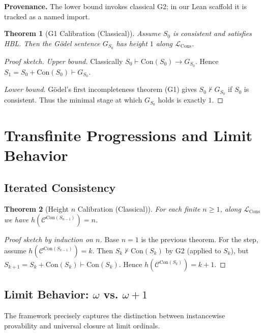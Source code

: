 \documentclass[11pt]{article}
\newtheorem{theorem}{Theorem}[section]
\newcommand{\Con}{\mathrm{Con}}
\newcommand{\LCons}{\mathcal{L}_{\mathrm{Cons}}}
\begin{document}
\begin{mdframed}[style=provenance]
\textbf{Provenance.} The lower bound invokes classical G2; in our Lean scaffold it is tracked as a named import.
\end{mdframed}

\begin{theorem}[G1 Calibration (Classical)]
Assume $S_0$ is consistent and satisfies HBL. Then the Gödel sentence $G_{S_0}$
has height $1$ along $\LCons$.
\end{theorem}

\begin{proof}[Proof sketch]
\emph{Upper bound.} Classically $S_0\vdash \Con(S_0)\to G_{S_0}$. Hence $S_1=S_0+\Con(S_0)\vdash G_{S_0}$.

\emph{Lower bound.} Gödel's first incompleteness theorem (G1) gives $S_0\nvdash G_{S_0}$ if $S_0$ is consistent.
Thus the minimal stage at which $G_{S_0}$ holds is exactly $1$.
\end{proof}

\section{Transfinite Progressions and Limit Behavior}

\subsection{Iterated Consistency}
\begin{theorem}[Height $n$ Calibration (Classical)]
For each finite $n\ge 1$, along $\LCons$ we have $h\!\left(\mathcal C^{\Con(S_{n-1})}\right)=n$.
\end{theorem}

\begin{proof}[Proof sketch by induction on $n$]
Base $n=1$ is the previous theorem. For the step, assume
$h(\mathcal C^{\Con(S_{k-1})})=k$. Then $S_k\nvdash \Con(S_k)$ by G2 (applied to $S_k$),
but $S_{k+1}=S_k+\Con(S_k)\vdash\Con(S_k)$. Hence $h(\mathcal C^{\Con(S_k)})=k+1$.
\end{proof}

\subsection{Limit Behavior: $\omega$ vs. $\omega+1$}
The framework precisely captures the distinction between instancewise provability and universal closure at limit ordinals.
\end{document}
